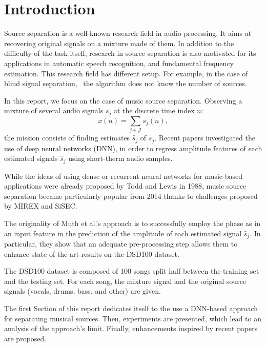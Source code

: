 \section{Introduction}

Source separation is a well-known research field in audio processing.
It aims at recovering original signals on a mixture made of them.
In addition to the difficulty of the task itself, research in source separation
 is also motivated for its applications in automatic
speech recognition, and fundamental frequency estimation.
This research field has different setup. For example, in the case of blind
signal separation,~\cite{comon2010handbook} the algorithm does not know the number of sources.

In this report, we focus on the case of music source separation.
Observing a mixture of several audio signals $s_j$ at the discrete time index $n$:
$$x(n) = \sum_{j\in \mathcal{J}} {s_j(n)},$$
the mission consists of finding estimates $\hat{s}_j$ of $s_j$.
Recent papers investigated the use of deep neural networks (DNN),
 in order to regress amplitude features of each estimated signals $\hat{s}_j$ using  short-therm audio samples.

While the ideas of using dense or recurrent neural networks for music-based applications were
already proposed  by Todd \cite{Todd1988} and Lewis \cite{Lewis1988} in 1988,
music source separation became particularly popular from 2014
thanks to challenges proposed by MIREX and SiSEC.

The originality of Muth et al.'s approach \cite{muth2018improving} is to
successfully employ the phase as in an input feature in the prediction of
the amplitude of each estimated signal $\hat{s}_j$.
In particular, they show that an adequate pre-processing step allows
them to enhance state-of-the-art results on the DSD100 dataset.

The DSD100 dataset is composed of 100 songs split half
between the training set and the testing set. For each song, the mixture signal
and the original source signals (vocals, drums, bass, and other) are given.

The first Section of this report dedicates itself to the use a DNN-based approach
 for separating musical sources. Then, experiments are presented,
  which lead to an analysis of the approach's limit.  
Finally, enhancements inspired by recent papers are proposed.
